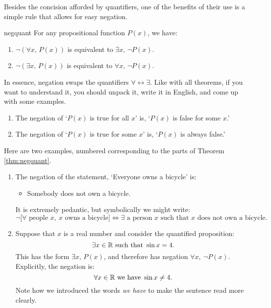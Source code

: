 Besides the concision afforded by quantifiers, one of the benefits of their use is a simple rule that allows for easy negation.

\begin{thm}{}{negquant}
For any propositional function $P(x)$, we have:
\begin{enumerate}
  \item $\neg(\forall x,\, P(x))$ is equivalent to $\exists x,\, \neg P(x)$.
  \item $\neg(\exists x,\, P(x))$ is equivalent to $\forall x,\, \neg P(x)$.
\end{enumerate}
\end{thm}
In essence, negation swaps the quantifiers $\forall\leftrightarrow\exists$. Like with all theorems, if you want to understand it, you should unpack it, write it in English, and come up with some examples.
\begin{enumerate}
  \item The negation of `$P(x)$ is true for all $x$' is, `$P(x)$ is false for some $x$.'
  \item The negation of `$P(x)$ is true for some $x$' is, `$P(x)$ is always false.'
\end{enumerate}


\begin{examples}
Here are two examples, numbered corresponding to the parts of Theorem \ref{thm:negquant}.
\begin{enumerate}
	\item The negation of the statement, `Everyone owns a bicycle' is:
	\begin{itemize}
  	\item[] Somebody does not own a bicycle.
	\end{itemize}
	It is extremely pedantic, but symbolically we might write:
	\[\neg\Big[\forall\text{ people }x,\ x\text{ owns a bicycle}\Big]\iff \exists\text{ a person $x$ such that $x$ does not own a bicycle}.\]
	\item Suppose that $x$ is a real number and consider the quantified proposition:
	\[\exists x\in\mathbb{R}\text{ such that }\sin x=4.\]
	This has the form $\exists x,\,P(x)$, and therefore has negation $\forall x,\ \neg P(x)$. Explicitly, the negation is:
	\[\forall x\in\mathbb{R}\text{ we have }\sin x\neq 4.\]
	Note how we introduced the words \emph{we have} to make the sentence read more clearly.
\end{enumerate}
\end{examples}


